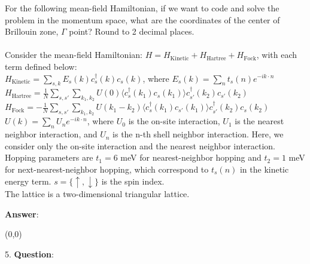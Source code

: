 \documentclass{article}
\begin{document}
   For the following mean-field Hamiltonian, if we want to code and solve the problem in the momentum space, what are the coordinates of the center of Brillouin zone, $\Gamma$ point? Round to 2 decimal places. \\ \\Consider the mean-field Hamiltonian: $H = H_{\text{Kinetic}} + H_{\text{Hartree}} +H_{\text{Fock}}$, with each term defined below: \\$H_{\text{Kinetic}} = \sum_{s, k} E_s(k) c^\dagger_s(k) c_s(k)$, where $E_s(k)=\sum_{n} t_s(n) e^{-i k \cdot n}$  \\$H_{\text{Hartree}} = \frac{1}{N} \sum_{s, s'} \sum_{k_1, k_2} U(0) \langle c_s^\dagger(k_1) c_s(k_1) \rangle c_{s'}^\dagger(k_2) c_{s'}(k_2)$ \\$H_{\text{Fock}} = -\frac{1}{N} \sum_{s, s'} \sum_{k_1, k_2} U(k_1 - k_2) \langle c_s^\dagger(k_1) c_{s'}(k_1) \rangle c_{s'}^\dagger(k_2) c_s(k_2)$ \\$U(k) = \sum_{n} U_n e^{-i k \cdot n}$, where $U_0$ is the on-site interaction, $U_1$ is the nearest neighbor interaction, and $U_n$ is the n-th shell neighbor interaction. Here, we consider only the on-site interaction and the nearest neighbor interaction. \\Hopping parameters are $t_1 = 6$ meV for nearest-neighbor hopping and $t_2 = 1$ meV for next-nearest-neighbor hopping, which correspond to $t_s(n)$ in the kinetic energy term. $s = \{\uparrow, \downarrow\}$ is the spin index. \\The lattice is a two-dimensional triangular lattice.

   \textbf{Answer}:

   (0,0) \\


\clearpage

5. \textbf{Question}:
\end{document}
